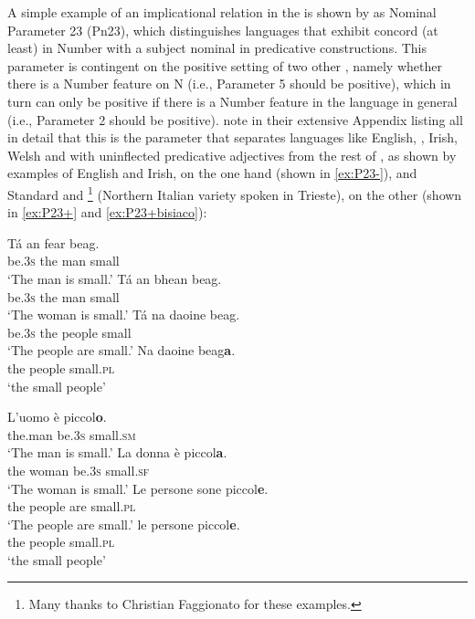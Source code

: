 \documentclass[output=paper,colorlinks,citecolor=brown]{langscibook}
\begin{document}
A simple example of an implicational relation in the  is shown by \citet{mm:longobardi_evidence_2009} as Nominal Parameter 23 (Pn23), which distinguishes languages that exhibit concord (at least) in Number with a subject nominal in predicative constructions. This parameter is contingent on the positive setting of two other , namely whether there is a Number feature on N (i.e., Parameter 5 should be positive), which in turn can only be positive if there is a Number feature in the language in general (i.e., Parameter 2 should be positive). \citet{mm:longobardi_evidence_2009} note in their extensive Appendix listing all  in detail that this is the parameter that separates languages like English, , Irish, Welsh and  with uninflected predicative adjectives from the rest of , as shown by examples of English and Irish, on the one hand (shown in \ref{ex:P23-}), and Standard  and \footnote{Many thanks to Christian Faggionato for these examples.} (Northern Italian variety spoken in Trieste), on the other (shown in \ref{ex:P23+} and \ref{ex:P23+bisiaco}):

\ea
\ea
\settowidth{}
\gll Tá an fear beag.\\
be.\textsc{3s} the man small\\
\glt `The man is small.'
\ex 
\gll Tá an bhean beag.\\
be.\textsc{3s} the man small\\
\glt `The woman is small.'
\ex
\gll Tá na daoine beag.\\
be.\textsc{3s} the people small\\ \jambox{[pl. predicative]}
\glt `The people are small.'
\ex
\gll Na daoine beag\textbf{a}.\\
the people small.\textsc{pl}\\  \jambox{[pl. attributive]}
\glt `the small people'
\z
\label{ex:P23-}
\z

\ea
\ea 
\settowidth{}
\gll L'uomo è piccol\textbf{o}.\\
the.man be.\textsc{3s} small.\textsc{sm}\\
\glt `The man is small.'
\ex 
\gll La donna è piccol\textbf{a}.\\
the woman be.\textsc{3s} small.\textsc{sf}\\
\glt `The woman is small.'
\ex 
\gll Le persone sone piccol\textbf{e}.\\
the people are small.\textsc{pl}\\\jambox{[pl. predicative]}
\glt `The people are small.'
\ex 
\gll le persone piccol\textbf{e}. \\
the people small.\textsc{pl}\\\jambox{[pl. attributive]}
\glt `the small people'
\z
\label{ex:P23+}
\z
\end{document}
